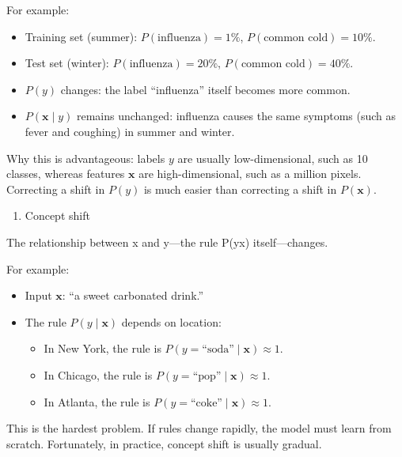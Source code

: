 For example:

\begin{itemize}
\tightlist
\item
  Training set (summer): \(P(\text{influenza})=1\%\), \(P(\text{common cold})=10\%\).
\item
  Test set (winter): \(P(\text{influenza})=20\%\), \(P(\text{common cold})=40\%\).
\item
  \(P(y)\) changes: the label ``influenza'' itself becomes more common.
\item
  \(P(\mathbf{x}\mid y)\) remains unchanged: influenza causes the same symptoms (such as fever and coughing) in summer and winter.
\end{itemize}

Why this is advantageous: labels \(y\) are usually low-dimensional, such as 10 classes, whereas features \(\mathbf{x}\) are high-dimensional, such as a million pixels. Correcting a shift in \(P(y)\) is much easier than correcting a shift in \(P(\mathbf{x})\).

\begin{enumerate}
\def\labelenumi{\arabic{enumi}.}
\setcounter{enumi}{2}
\tightlist
\item
  Concept shift
\end{enumerate}

The relationship between x and y---the rule P(y\textbar x) itself---changes.

For example:

\begin{itemize}
\tightlist
\item
  Input \(\mathbf{x}\): ``a sweet carbonated drink.''
\item
{}
  The rule \(P(y\mid\mathbf{x})\) depends on location:

  \begin{itemize}
  \tightlist
  \item
    In New York, the rule is \(P(y=\text{“soda”}\mid\mathbf{x})\approx 1\).
  \item
    In Chicago, the rule is \(P(y=\text{“pop”}\mid\mathbf{x})\approx 1\).
  \item
    In Atlanta, the rule is \(P(y=\text{“coke”}\mid\mathbf{x})\approx 1\).
  \end{itemize}
\end{itemize}

This is the hardest problem. If rules change rapidly, the model must learn from scratch. Fortunately, in practice, concept shift is usually gradual.

